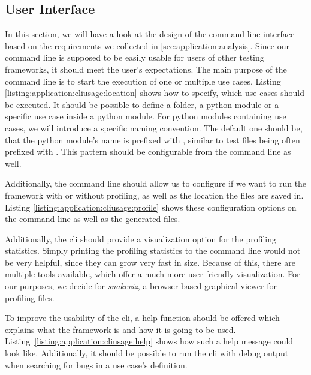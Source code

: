 \subsection{User Interface}

In this section, we will have a look at the design of the command-line interface
based on the requirements we collected in \ref{sec:application:analysis}. Since
our command line is supposed to be easily usable for users of other testing
frameworks, it should meet the user's expectations. The main purpose of the
command line is to start the execution of one or multiple use cases. Listing
\ref{listing:application:cliusage:location} shows how to specify, which use
cases should be executed. It should be possible to define a folder, a python
module or a specific use case inside a python module. For python modules
containing use cases, we will introduce a specific naming convention. The
default one should be, that the python module's name is prefixed with
, similar to test files being often prefixed with
. This pattern should be configurable from the
command line as well.



Additionally, the command line should allow us to configure if we want to run
the framework with or without profiling, as well as the location the files are
saved in. Listing \ref{listing:application:cliusage:profile} shows these
configuration options on the command line as well as the generated files.



Additionally, the \gls{cli} should provide a visualization option for the
profiling statistics. Simply printing the profiling statistics to the command
line would not be very helpful, since they can grow very fast in size. Because
of this, there are multiple tools available, which offer a much more
user-friendly visualization. For our purposes, we decide for \emph{snakeviz}, a
browser-based graphical viewer for profiling files.  \cite{Snakeviz}

To improve the usability of the \gls{cli}, a help function should be offered
which explains what the framework is and how it is going to be used.
Listing \ref{listing:application:cliusage:help} shows how such a help message
could look like. Additionally, it should be possible to run the \gls{cli} with
debug output when searching for bugs in a use case's definition. 

